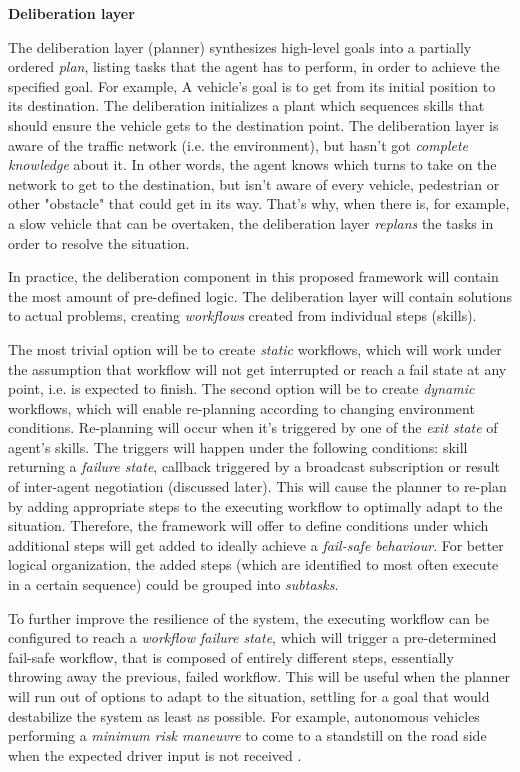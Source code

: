 \documentclass[main.tex]{subfiles}
\begin{document}
\textbf{Deliberation layer}

The deliberation layer (planner) synthesizes high-level goals into a partially ordered \emph{plan}, listing tasks that 
the agent has to perform, in order to achieve the specified goal. For example, A vehicle's goal is to get from 
its initial position to its destination. The deliberation initializes a plant which sequences skills that 
should ensure the vehicle gets to the destination point. The deliberation layer is aware of the traffic network 
(i.e. the environment), but hasn't got \emph{complete knowledge} about it. In other words, the agent knows which turns
to take on the network to get to the destination, but isn't aware of every vehicle, pedestrian or other "obstacle" that 
could get in its way. That's why, when there is, for example, a slow vehicle that can be overtaken, the deliberation layer 
\emph{replans} the tasks in order to resolve the situation. 

In practice, the deliberation component in this proposed framework will contain the most amount
of pre-defined logic.  The deliberation layer will contain solutions to actual problems,
creating \emph{workflows} created from individual steps (skills).

The most trivial option will be to create \emph{static} workflows, which will work under the
assumption that workflow will not get interrupted or reach a fail state at any point, i.e. is
expected to finish. The second option will be to create \emph{dynamic} workflows, which will enable
re-planning according to changing environment conditions.  Re-planning will occur when it's
triggered by one of the \emph{exit state} of agent's skills. The triggers will happen under the
following conditions: skill returning a \emph{failure state}, callback triggered by a broadcast
subscription or result of inter-agent negotiation (discussed later). This will cause the
planner to re-plan by adding appropriate steps to the executing workflow to optimally adapt to
the situation. Therefore, the framework will offer to define conditions under which additional
steps will get added to ideally achieve a \emph{fail-safe behaviour}. For better logical
organization, the added steps (which are identified to most often execute in a certain
sequence) could be grouped into \emph{subtasks}.

To further improve the resilience of the
system, the executing workflow can be configured to reach a \emph{workflow failure state},
which will trigger a pre-determined fail-safe workflow, that is composed of entirely different
steps, essentially throwing away the previous, failed workflow.  This will be useful when the
planner will run out of options to adapt to the situation, settling for a goal that would
destabilize the system as least as possible. For example, autonomous vehicles performing a
\emph{minimum risk maneuvre} to come to a standstill on the road side when the expected driver
input is not received \cite{WorkingAutonomous2022}.
\end{document}
